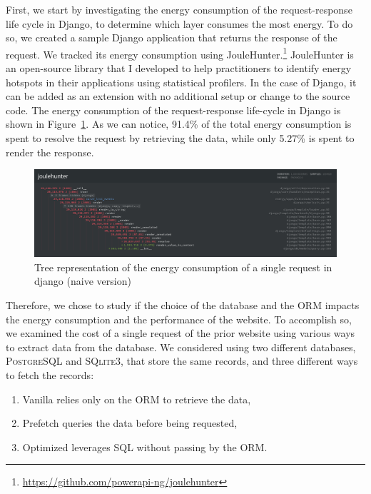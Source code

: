 First, we start by investigating the energy consumption of the request-response life cycle in Django, to determine which layer consumes the most energy.
To do so, we created a sample Django application that returns the response of the request. We tracked its energy consumption using JouleHunter.\footnote{\url{https://github.com/powerapi-ng/joulehunter}}
JouleHunter is an open-source library that I developed to help practitioners to identify  energy hotspots in their applications using statistical profilers.
In the case of Django, it can be added as an extension with no additional setup or change to the source code.
The energy consumption of the request-response life-cycle in Django is shown in Figure~\ref{fig:django_life_cycle_naive}.
As we can notice, 91.4\% of the total energy consumption is spent to resolve the request by retrieving the data, while only 5.27\% is spent to render the response.

\begin{figure}[hbt]
    \centering
    \includegraphics[width=\linewidth]{imgs/django_life_cycle_naive}
    \caption{Tree representation of the energy consumption of a single request in django (naive version)}
    \label{fig:django_life_cycle_naive}
\end{figure}

Therefore, we chose to study if the choice of the database and the ORM impacts the energy consumption and the performance of the website.
To accomplish so, we examined the cost of a single request of the prior website using various ways to extract data from the database.
We considered using two different databases, \textsc{PostgreSQL} and \textsc{SQlite3}, that store the same records, and three different ways to fetch the records:
\begin{enumerate}
    \item \textsf{Vanilla} relies only on the ORM to retrieve the data,
    \item \textsf{Prefetch} queries the data before being requested,
    \item \textsf{Optimized} leverages SQL without passing by the ORM.
\end{enumerate}

